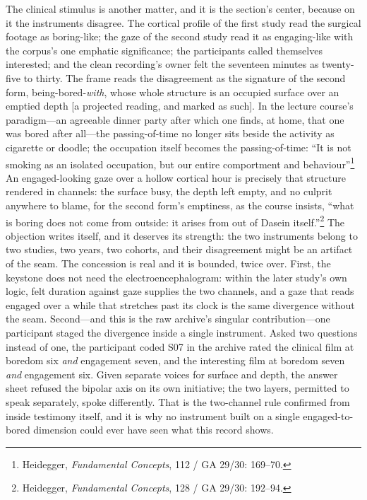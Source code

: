 The clinical stimulus is another matter, and it is the section's center, because on it the instruments disagree. The cortical profile of the first study read the surgical footage as boring-like; the gaze of the second study read it as engaging-like with the corpus's one emphatic significance; the participants called themselves interested; and the clean recording's owner felt the seventeen minutes as twenty-five to thirty. The frame reads the disagreement as the signature of the second form, being-bored-\textit{with}, whose whole structure is an occupied surface over an emptied depth [a projected reading, and marked as such]. In the lecture course's paradigm---an agreeable dinner party after which one finds, at home, that one was bored after all---the passing-of-time no longer sits beside the activity as cigarette or doodle; the occupation itself becomes the passing-of-time: ``It is not smoking as an isolated occupation, but our entire comportment and behaviour''\footnote{Heidegger, \textit{Fundamental Concepts}, 112 / GA 29/30: 169--70.} An engaged-looking gaze over a hollow cortical hour is precisely that structure rendered in channels: the surface busy, the depth left empty, and no culprit anywhere to blame, for the second form's emptiness, as the course insists, ``what is boring does not come from outside: it arises from out of Dasein itself.''\footnote{Heidegger, \textit{Fundamental Concepts}, 128 / GA 29/30: 192--94.} The objection writes itself, and it deserves its strength: the two instruments belong to two studies, two years, two cohorts, and their disagreement might be an artifact of the seam. The concession is real and it is bounded, twice over. First, the keystone does not need the electroencephalogram: within the later study's own logic, felt duration against gaze supplies the two channels, and a gaze that reads engaged over a while that stretches past its clock is the same divergence without the seam. Second---and this is the raw archive's singular contribution---one participant staged the divergence inside a single instrument. Asked two questions instead of one, the participant coded S07 in the archive rated the clinical film at boredom six \textit{and} engagement seven, and the interesting film at boredom seven \textit{and} engagement six. Given separate voices for surface and depth, the answer sheet refused the bipolar axis on its own initiative; the two layers, permitted to speak separately, spoke differently. That is the two-channel rule confirmed from inside testimony itself, and it is why no instrument built on a single engaged-to-bored dimension could ever have seen what this record shows.

